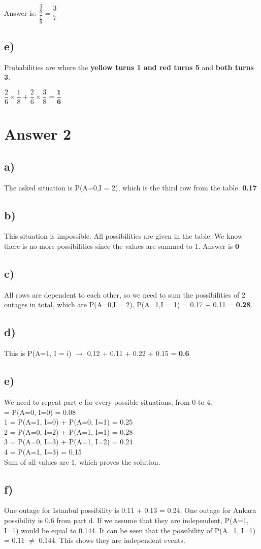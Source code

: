 \documentclass[12pt]{article}
\begin{document}
Answer is: $ \dfrac{\frac{3}{8}}{\frac{7}{8}} = \dfrac{3}{7}$
\newpage
\subsection*{e)}
Probabilities are where the \textbf{yellow turns 1 and red turns 5} and \textbf{both turns 3}.

$\dfrac{2}{6} \times \dfrac{1}{8} + \dfrac{2}{6} \times \dfrac{3}{8} = \mathbf{\dfrac{1}{6}}$

\section*{Answer 2}
\subsection*{a)}
The asked situation is P(A=0,I = 2), which is the third row from the table. \textbf{0.17}
\subsection*{b)}
This situation is impossible. All possibilities are given in the table. We know there is no more possibilities since the values are summed to 1. Answer is \textbf{0}
\subsection*{c)}
All rows are dependent to each other, so we need to sum the possibilities of 2 outages in total, which are P(A=0,I = 2), P(A=1,I = 1) = 0.17 + 0.11 = \textbf{0.28}.
\subsection*{d)}
This is P(A=1, I = i) $\rightarrow$ 0.12 + 0.11 + 0.22 + 0.15 = \textbf{0.6}  
\subsection*{e)}
\noindent
We need to repeat part c for every possible situations, from 0 to 4.\\

 = P(A=0, I=0) = 0.08\\
1 = P(A=1, I=0) + P(A=0, I=1) = 0.25\\
2 = P(A=0, I=2) + P(A=1, I=1) = 0.28\\
3 = P(A=0, I=3) + P(A=1, I=2) = 0.24\\
4 = P(A=1, I=3) = 0.15\\

\noindent
Sum of all values are 1, which proves the solution.

\subsection*{f)}
One outage for Istanbul possibility is 0.11 + 0.13 = 0.24. One outage for Ankara possibility is 0.6 from part d. If we assume that they are independent, P(A=1, I=1) would be equal to 0.144. It can be seen that the possibility of P(A=1, I=1) = 0.11 $\neq$ 0.144. This shows they are independent events.
\end{document}

